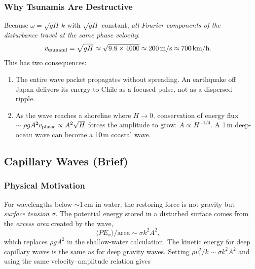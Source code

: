 \subsubsection*{Why Tsunamis Are Destructive}

Because $\omega = \sqrt{gH}\,k$ with $\sqrt{gH}$ constant, \emph{all Fourier
components of the disturbance travel at the same phase velocity}:
\begin{equation}
    v_{\rm tsunami} = \sqrt{gH}
    \approx \sqrt{9.8\times4000}
    \approx 200\,\text{m/s}
    \approx 700\,\text{km/h}.
    \label{eq:lec10:tsunami-speed}
\end{equation}
This has two consequences:
\begin{enumerate}
    \item The entire wave packet propagates without spreading. An earthquake
    off Japan delivers its energy to Chile as a focused pulse, not as a dispersed
    ripple.
    \item As the wave reaches a shoreline where $H\to0$, conservation of energy
    flux $\sim\rho g A^2 v_{\rm phase}\propto A^2\sqrt{H}$ forces the amplitude to
    grow: $A\propto H^{-1/4}$. A 1\,m deep-ocean wave can become a 10\,m coastal
    wave.
\end{enumerate}


\subsection{Capillary Waves (Brief)}
\label{sec:lec10:capillary}

\subsubsection*{Physical Motivation}
For wavelengths below $\sim 1\,\text{cm}$ in water, the restoring force is
not gravity but \emph{surface tension} $\sigma$. The potential energy stored in
a disturbed surface comes from the \emph{excess area} created by the wave,
\[
    \langle PE_{\sigma}\rangle/\text{area} \sim \sigma k^2 A^2,
\]
which replaces $\rho g A^2$ in the shallow-water calculation. The kinetic
energy for deep capillary waves is the same as for deep gravity waves. Setting
$\rho v_1^2/k \sim \sigma k^2 A^2$ and using the same velocity--amplitude
relation gives

